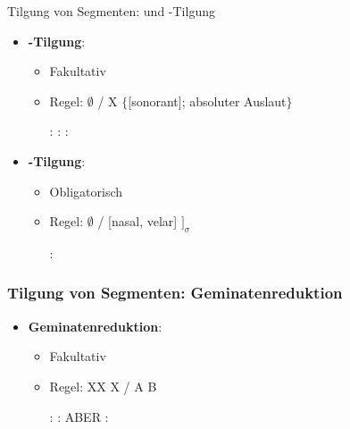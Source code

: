 \begin{frame}{Tilgung von Segmenten:  und -Tilgung}

\begin{itemize}
	\item \textbf{-Tilgung}:
	
	\begin{itemize}
		\item Fakultativ
		\item Regel:  \ras $\emptyset$ / X \underline{\quad} $\{$[sonorant]; absoluter Auslaut$\}$
	
	\eal
		\ex {}:  \ras \textipa{[ge:n]}
		\ex {}:  \ras \textipa{[k\t{aU}f]}
		\ex {}:  \ras {}
	\zl
	
	\end{itemize}

	\item \textbf{-Tilgung}:
	
	\begin{itemize}
		\item Obligatorisch
		\item Regel:  \ras $\emptyset$ / [nasal, velar] \underline{\quad} $]_\sigma$
		
		\ea {}:  \ras {}
		\z
		
	\end{itemize}
			
\end{itemize}

\end{frame}


\begin{frame}
\frametitle{Tilgung von Segmenten: Geminatenreduktion}

\begin{itemize}
	\item \textbf{Geminatenreduktion}:

	\begin{itemize}
		\item Fakultativ
		\item Regel: XX \ras X / A \underline{\quad} B

	\eal
		\ex {}:  \ras {}
		\ex {}:  \ras \textipa{[SI\.{f}a:{\textscr}t]}
		\ex ABER :  \ras \textipa{[\t{ts}o:.Po.p5]}
	\zl
	
	\end{itemize}
	
\end{itemize}

\end{frame}



